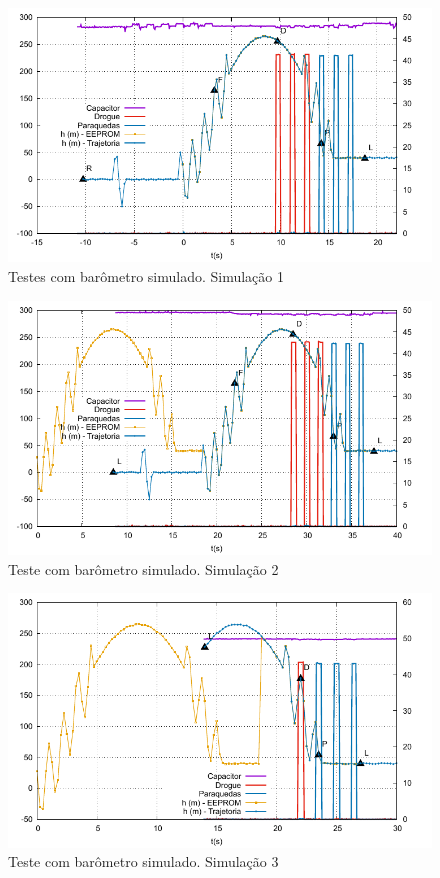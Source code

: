 \documentclass[12pt,a4paper]{article}
\begin{document}
\begin{figure}[!ht]
	\centering
	\includegraphics[width=\textwidth]{./data/simulations-v1.5.5/sim01/fig}
	\caption{Testes com barômetro simulado.  Simulação 1}
	\label{fig:sim01}
\end{figure}
\begin{figure}[!ht]
	\centering
	\includegraphics[width=\textwidth]{./data/simulations-v1.5.5/sim02/fig}
	\caption{Teste com barômetro simulado.  Simulação 2}
	\label{fig:sim02}
\end{figure}
\begin{figure}[!ht]
	\centering
	\includegraphics[width=\textwidth]{./data/simulations-v1.5.5/sim03/fig}
	\caption{Teste com barômetro simulado.  Simulação 3}
	\label{fig:sim03}
\end{figure}
\end{document}
